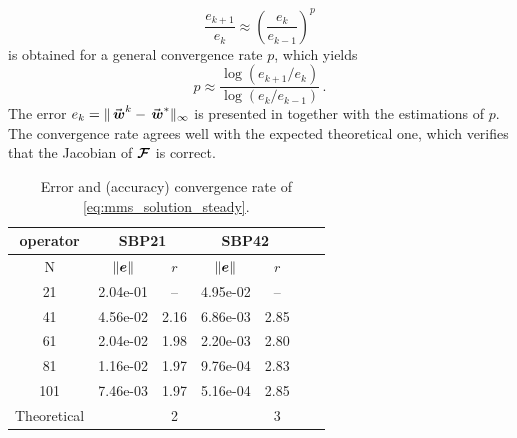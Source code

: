 \[
  \frac{e_{k+1}}{e_{k}} \approx
  \left(\frac{e_{k}}{e_{k-1}}\right)^p
\]
is obtained for a general convergence rate $p$, which yields
\[
   p \approx \frac{\log(e_{k+1}/e_k)}{\log(e_{k}/e_{k-1})}
   \, .
\]
The error $e_k = \|\wn^k-\wn^*\|_\infty$ is presented in  together with the estimations of $p$. The convergence rate agrees well with the expected theoretical one, which verifies that the Jacobian of $\bm{\mathcal{F}}$ is correct. 
\begin{table}
\centering
\setlength{\tabcolsep}{12pt}
\begin{tabular}{c| cc | cc cc}
 \hline
 \hline
 operator
 & \multicolumn{2}{c|}{SBP21}
 & \multicolumn{2}{c}{SBP42}
 \\
\hline
 \hline
N & $\|\bm{e}\|$ & $r$ &$\|\bm{e}\|$ & $r$
\\
\hline
21 & 2.04e-01 & --   & 4.95e-02 & --  \\
41 & 4.56e-02 & 2.16 & 6.86e-03 & 2.85 \\
61 & 2.04e-02 & 1.98 & 2.20e-03 & 2.80 \\
81 & 1.16e-02 & 1.97 & 9.76e-04 & 2.83 \\
101& 7.46e-03 & 1.97 & 5.16e-04 & 2.85    
\\
\hline
Theoretical && 2 && 3
\end{tabular}
\caption{Error and (accuracy) convergence rate of \eqref{eq:mms_solution_steady}.}%
\label{tab:convergence_table_steady}
\end{table}

